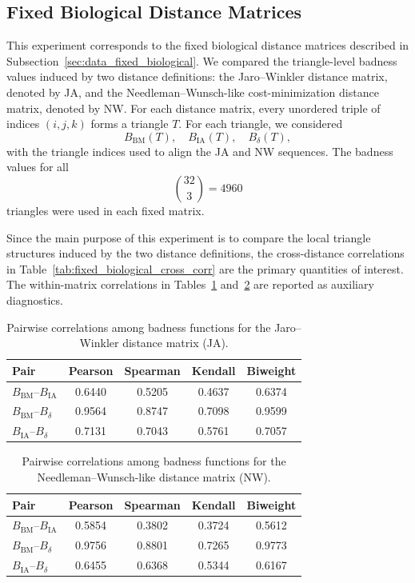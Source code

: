 \documentclass[11pt]{article}
\begin{document}
\subsection{Fixed Biological Distance Matrices}
\label{sec:fixed_biological_matrix_results}

This experiment corresponds to the fixed biological distance matrices described in Subsection~\ref{sec:data_fixed_biological}. We compared the triangle-level badness values induced by two distance definitions: the Jaro--Winkler distance matrix, denoted by JA, and the Needleman--Wunsch-like cost-minimization distance matrix, denoted by NW. For each distance matrix, every unordered triple of indices \((i,j,k)\) forms a triangle \(T\). For each triangle, we considered
\[
B_{\mathrm{BM}}(T),\quad B_{\mathrm{IA}}(T),\quad B_{\delta}(T),
\]
with the triangle indices used to align the JA and NW sequences. The badness values for all
\[
\binom{32}{3}=4960
\]
triangles were used in each fixed matrix.

Since the main purpose of this experiment is to compare the local triangle structures induced by the two distance definitions, the cross-distance correlations in Table~\ref{tab:fixed_biological_cross_corr} are the primary quantities of interest. The within-matrix correlations in Tables~\ref{tab:fixed_biological_JA_corr} and~\ref{tab:fixed_biological_NW_corr} are reported as auxiliary diagnostics.

\begin{table}[h!]
\centering
\caption{Pairwise correlations among badness functions for the Jaro--Winkler distance matrix (JA).}
\label{tab:fixed_biological_JA_corr}
\small
\setlength{\tabcolsep}{7pt}
\begin{tabular}{lcccc}
\hline
Pair & Pearson & Spearman & Kendall & Biweight \\
\hline
\(B_{\mathrm{BM}}\)--\(B_{\mathrm{IA}}\)     & 0.6440 & 0.5205 & 0.4637 & 0.6374 \\
\(B_{\mathrm{BM}}\)--\(B_{\delta}\)          & 0.9564 & 0.8747 & 0.7098 & 0.9599 \\
\(B_{\mathrm{IA}}\)--\(B_{\delta}\)          & 0.7131 & 0.7043 & 0.5761 & 0.7057 \\
\hline
\end{tabular}
\end{table}

\begin{table}[h!]
\centering
\caption{Pairwise correlations among badness functions for the Needleman--Wunsch-like distance matrix (NW).}
\label{tab:fixed_biological_NW_corr}
\small
\setlength{\tabcolsep}{7pt}
\begin{tabular}{lcccc}
\hline
Pair & Pearson & Spearman & Kendall & Biweight \\
\hline
\(B_{\mathrm{BM}}\)--\(B_{\mathrm{IA}}\)     & 0.5854 & 0.3802 & 0.3724 & 0.5612 \\
\(B_{\mathrm{BM}}\)--\(B_{\delta}\)          & 0.9756 & 0.8801 & 0.7265 & 0.9773 \\
\(B_{\mathrm{IA}}\)--\(B_{\delta}\)          & 0.6455 & 0.6368 & 0.5344 & 0.6167 \\
\hline
\end{tabular}
\end{table}
\end{document}
